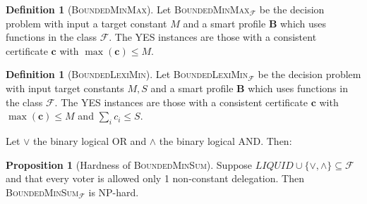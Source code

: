 \documentclass[11pt,a4paper, titlepage]{article}
\theoremstyle{definition}
\newtheorem{definition}[theorem]{Definition}
\newtheorem{proposition}[theorem]{Proposition}
\let\vec\mathbf
\begin{document}
\begin{definition}[\textsc{BoundedMinMax}]
    Let \textsc{BoundedMinMax}$_\mathcal{F}$ be the decision problem with input a target constant $M$ and a smart profile $\mathbf{B}$ which uses functions in the class $\mathcal{F}$. The YES instances are those with a consistent certificate  $\vec{c}$ with $\max(\vec{c}) \leq M$. 
\end{definition}

\begin{definition}[\textsc{BoundedLexiMin}]
    Let \textsc{BoundedLexiMin}$_\mathcal{F}$ be the decision problem with input target constants $M, S$ and a smart profile $\mathbf{B}$ which uses functions in the class $\mathcal{F}$. The YES instances are those with a consistent certificate  $\vec{c}$ with $\max (\vec{c}) \leq M$ and $\sum_i c_i \leq S$.
\end{definition}

Let $\lor$ the binary logical OR and $\land$ the binary logical AND. Then:

\begin{proposition}[Hardness of \textsc{BoundedMinSum}]
    Suppose $\mathit{LIQUID} \cup \{\lor, \land\} \subseteq \mathcal{F}$ and that every voter is allowed only 1 non-constant delegation. Then \textsc{BoundedMinSum}$_\mathcal{F}$ is NP-hard.    
\end{proposition}
\end{document}
